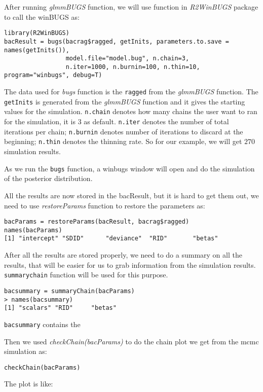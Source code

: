 \documentclass{article}
\begin{document}
After running \textit{glmmBUGS} function, we will use  function in \textit{R2WinBUGS} package
to call the winBUGS as: 
\begin{verbatim}
library(R2WinBUGS)
bacResult = bugs(bacrag$ragged, getInits, parameters.to.save = names(getInits()),
                 model.file="model.bug", n.chain=3, 
                 n.iter=1000, n.burnin=100, n.thin=10, program="winbugs", debug=T)
\end{verbatim}
The data used for \textit{bugs} function is the \verb!ragged! from the \textit{glmmBUGS} function. The \verb!getInits! is generated from the \textit{glmmBUGS} function and it gives the starting values for the simulation. \verb!n.chain! denotes how many chains the user want to ran for the simulation, it is $3$ as default. \verb!n.iter!
denotes the number of total iterations per chain; \verb!n.burnin! denotes number of iterations to discard at the beginning; \verb!n.thin! denotes the thinning rate. So for our example, we will get $270$ simulation results.

As we run the \verb!bugs! function, a winbugs window will open and do the simulation of the posterior distribution.

All the results are now stored in the bacResult, but it is hard to get them out, we need to use  \textit{restoreParams} function to restore the parameters as: 

\begin{verbatim}
bacParams = restoreParams(bacResult, bacrag$ragged) 
names(bacParams)
[1] "intercept" "SDID"      "deviance"  "RID"       "betas"    
\end{verbatim}

After all the results are stored properly, we need to do a summary on all the results, that will be easier for us to grab information from the simulation results. \verb!summarychain! function will be used for this purpose.
\begin{verbatim}
bacsummary = summaryChain(bacParams)
> names(bacsummary)
[1] "scalars" "RID"     "betas"  

\end{verbatim}

\verb!bacsummary! contains the 

Then we used \textit{checkChain(bacParams)} to do the chain plot we get from the mcmc simulation as:
\begin{verbatim}
checkChain(bacParams)
\end{verbatim}

The plot is like: 
\end{document}
